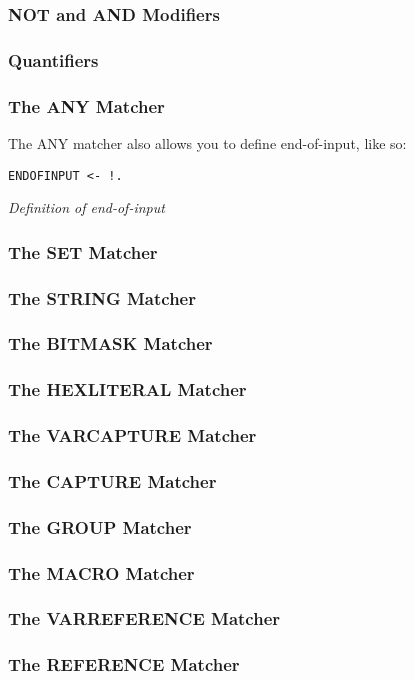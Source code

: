 \subsubsection{NOT and AND Modifiers}

\subsubsection{Quantifiers}

\subsubsection{The ANY Matcher}

The ANY matcher also allows you to define end-of-input, like so:

\begin{myquote}
\begin{verbatim}
ENDOFINPUT <- !.

\end{verbatim}
\end{myquote}
\textit{Definition of end-of-input}

\subsubsection{The SET Matcher}

\subsubsection{The STRING Matcher}

\subsubsection{The BITMASK Matcher}

\subsubsection{The HEXLITERAL Matcher}

\subsubsection{The VARCAPTURE Matcher}

\subsubsection{The CAPTURE Matcher}

\subsubsection{The GROUP Matcher}

\subsubsection{The MACRO Matcher}

\subsubsection{The VARREFERENCE Matcher}

\subsubsection{The REFERENCE Matcher}



